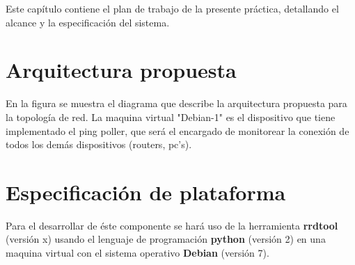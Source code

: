 %

Este capítulo contiene el plan de trabajo de la presente práctica, detallando el alcance y la especificación del sistema.

\section{Arquitectura propuesta}

En la figura \TODO se muestra el diagrama que describe la arquitectura propuesta para la topología de red. La maquina virtual "Debian-1" es el dispositivo que tiene implementado el ping poller, que será el encargado de monitorear la conexión de todos los demás dispositivos (routers, pc's).


\section{Especificación de plataforma}

Para el desarrollar de éste componente se hará uso de la herramienta \textbf{rrdtool} (versión x) usando el lenguaje de programación \textbf{python} (versión 2) en una maquina virtual con el sistema operativo \textbf{Debian} (versión 7).

